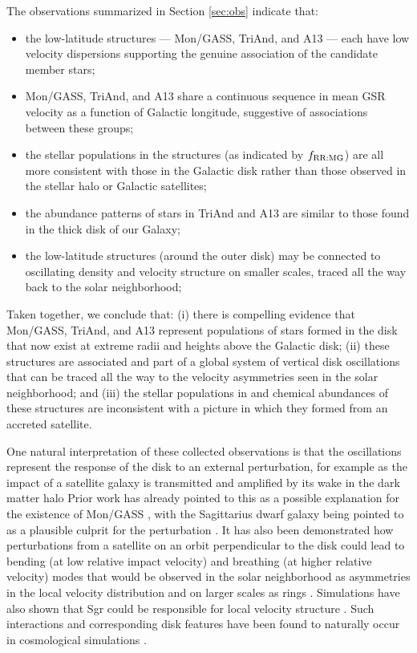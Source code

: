 \documentclass[galaxies,article,submit,moreauthors,pdftex,10pt,a4paper]{mdpi}
\newcommand{\frrmg}{\ensuremath{f_{\rm RR:MG}}}
\begin{document}
The observations summarized in Section \ref{sec:obs} indicate that:
\begin{itemize}
\item the low-latitude structures --- Mon/GASS, TriAnd, and A13  --- each have
      low velocity dispersions supporting the genuine association of the
      candidate member stars;
\item Mon/GASS, TriAnd, and A13 share a continuous sequence in mean GSR velocity
      as a function of Galactic longitude, suggestive of associations between
      these groups;
\item the stellar populations in the structures (as indicated by \frrmg) are all
      more consistent with those in the Galactic disk rather than those observed
      in the stellar halo or Galactic satellites;
\item the abundance patterns of stars in TriAnd and A13 are similar to those
      found in the thick disk of our Galaxy;
\item the low-latitude structures (around the outer disk) may be connected to
      oscillating density and velocity structure on smaller scales, traced all
      the way back to the solar neighborhood;
\end{itemize}
Taken together, we conclude that: (i) there is compelling evidence that
Mon/GASS, TriAnd, and A13 represent populations of stars formed in the disk that
now exist at extreme radii and heights above the Galactic disk;
(ii) these structures are associated and part of a global system of vertical
disk oscillations that can be traced all the way to the velocity asymmetries
seen in the solar neighborhood; and
(iii) the stellar populations in and chemical abundances of these structures are
inconsistent with a picture in which they formed from an accreted satellite.

One natural interpretation of these collected observations is that the oscillations represent the response of the disk to an external perturbation, for example as the impact of a satellite galaxy is transmitted and amplified by its wake in the dark matter halo \cite[as described for the LMC in][]{weinberg06}
Prior work has already pointed to this as a possible explanation for the existence of Mon/GASS \cite{kazantzidis08,younger08}, with the Sagittarius dwarf galaxy being pointed to as a plausible culprit for the perturbation \cite{purcell11}.
It has also been demonstrated how perturbations from a satellite on an orbit perpendicular to the disk could lead to bending (at low relative impact velocity) and breathing (at higher relative velocity) modes that would be observed in the solar neighborhood as asymmetries in the local velocity distribution  \cite{widrow14} and on larger scales as rings \cite{donghia16}.
Simulations have also shown that Sgr could be responsible for local velocity structure  \cite{gomez13}.
Such interactions and corresponding disk features have been found to naturally occur in cosmological simulations \cite{gomez16}.
\end{document}
